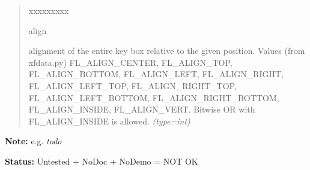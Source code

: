 \begin{boxedminipage}{\funcwidth}
\begin{quote}
\begin{Ventry}{xxxxxxxxx}
          \item[align]


alignment of the entire key box relative to the given position. Values
(from xfdata.py) FL\_ALIGN\_CENTER, FL\_ALIGN\_TOP, FL\_ALIGN\_BOTTOM,
FL\_ALIGN\_LEFT, FL\_ALIGN\_RIGHT, FL\_ALIGN\_LEFT\_TOP, FL\_ALIGN\_RIGHT\_TOP,
FL\_ALIGN\_LEFT\_BOTTOM, FL\_ALIGN\_RIGHT\_BOTTOM, FL\_ALIGN\_INSIDE,
FL\_ALIGN\_VERT. Bitwise OR with FL\_ALIGN\_INSIDE is allowed.
            {\it (type=int)}

        \end{Ventry}

      \end{quote}

\textbf{Note:} 
e.g. \emph{todo}


\textbf{Status:} 
Untested + NoDoc + NoDemo = NOT OK


    \end{boxedminipage}

    \label{xformslib:flxyplot:fl_set_xyplot_key}

    \vspace{0.5ex}

